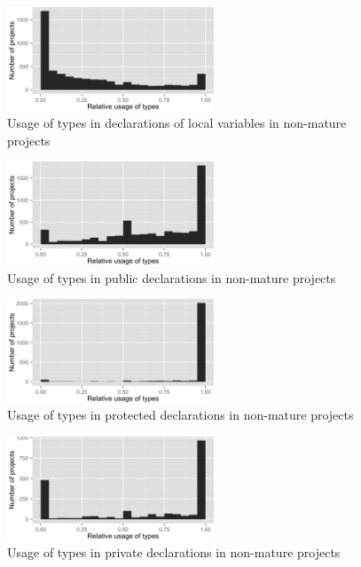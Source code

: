 \begin{figure}[h]
\centering 
\includegraphics[width=0.55\textwidth]{../aosd_2014/analysis/result/script/class/histograms/6_Local_Variable.png} 
\caption{Usage of types in declarations of local variables in non-mature projects}
\end{figure}

\begin{figure}[h]
\centering 
\includegraphics[width=0.55\textwidth]{../aosd_2014/analysis/result/script/class/histograms/13_Public.png} 
\caption{Usage of types in public declarations in non-mature projects}
\end{figure}

\begin{figure}[h]
\centering 
\includegraphics[width=0.55\textwidth]{../aosd_2014/analysis/result/script/class/histograms/12_Protected.png} 
\caption{Usage of types in protected declarations in non-mature projects}
\end{figure}

\begin{figure}[h]
\centering 
\includegraphics[width=0.55\textwidth]{../aosd_2014/analysis/result/script/class/histograms/11_Private.png} 
\caption{Usage of types in private declarations in non-mature projects}
\end{figure}